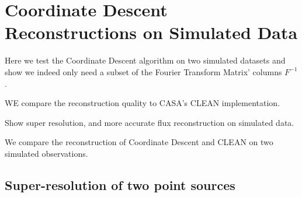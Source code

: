 \section{Coordinate Descent Reconstructions on Simulated Data}
Here we test the Coordinate Descent algorithm on two simulated datasets and show we indeed only need a subset of the Fourier Transform Matrix' columns $F^{-1}$.

WE compare the reconstruction quality to CASA's CLEAN implementation.

Show super resolution, and more accurate flux reconstruction on simulated data.

We compare the reconstruction of Coordinate Descent and CLEAN on two simulated observations.

\subsection{Super-resolution of two point sources}

